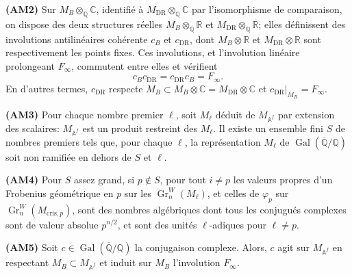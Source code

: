 \documentclass[12pt,a4paper]{article}
\theoremstyle{plain}
\theoremstyle{definition}
\theoremstyle{remark}
\DeclareMathOperator{\Gal}{Gal}
\DeclareMathOperator{\Gr}{Gr}
\providecommand{\Gal}{\operatorname{Gal}}
\providecommand{\DR}{\mathrm{DR}}
\providecommand{\cris}{\mathrm{cris}}
\begin{document}
\textbf{(AM2)} Sur $M_B \otimes_{\mathbb{Q}} \mathbb{C}$, identifi\'e \`a
$M_{\DR} \otimes_{\mathbb{Q}} \mathbb{C}$ par l'isomorphisme de comparaison, on dispose des
deux structures r\'eelles $M_B \otimes_{\mathbb{Q}} \mathbb{R}$ et
$M_{\DR} \otimes_{\mathbb{Q}} \mathbb{R}$; elles d\'efinissent des involutions antilin\'eaires
coh\'erente $c_B$ et $c_{\DR}$, dont $M_B \otimes \mathbb{R}$ et $M_{\DR} \otimes \mathbb{R}$
 sont respectivement les points fixes. Ces involutions, et l'involution lin\'eaire
prolongeant $F_\infty$, commutent entre elles et v\'erifient
\[
c_B c_{\DR} = c_{\DR} c_B = F_\infty.
\]
En d'autres termes, $c_{\DR}$ respecte $M_B \subset M_B \otimes \mathbb{C} =
M_{\DR} \otimes \mathbb{C}$ et $c_{\DR}|_{M_B} = F_\infty$.

\textbf{(AM3)} Pour chaque nombre premier $\ell$, soit $M_\ell$ d\'eduit de
$M_{\mathbb{A}^f}$ par extension des scalaires: $M_{\mathbb{A}^f}$ est un produit restreint
des $M_\ell$. Il existe un ensemble fini $S$ de nombres premiers tels que, pour chaque
$\ell$, la repr\'esentation $M_\ell$ de $\Gal(\overline{\mathbb{Q}}/\mathbb{Q})$ soit non ramifi\'ee
en dehors de $S$ et $\ell$.

\textbf{(AM4)} Pour $S$ assez grand, si $p \notin S$, pour tout $i \neq p$ les valeurs
propres d'un Frobenius g\'eom\'etrique en $p$ sur les $\Gr^W_n(M_\ell)$, et celles de
$\varphi_p$ sur $\Gr^W_n(M_{\cris,p})$, sont des nombres alg\'ebriques dont tous les
conjugu\'es complexes sont de valeur absolue $p^{n/2}$, et sont des unit\'es
$\ell$-adiques pour $\ell \neq p$.

\textbf{(AM5)} Soit $c \in \Gal(\overline{\mathbb{Q}}/\mathbb{Q})$ la conjugaison complexe. Alors,
$c$ agit sur $M_{\mathbb{A}^f}$ en respectant $M_B \subset M_{\mathbb{A}^f}$ et induit sur
$M_B$ l'involution $F_\infty$.
\end{document}
